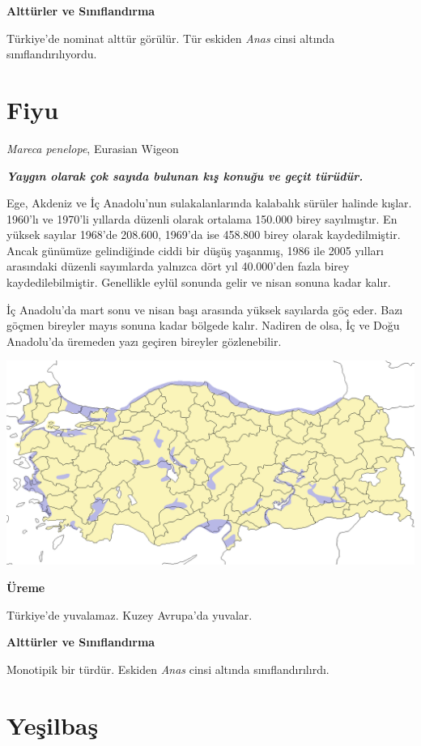 \documentclass[
  a4paper,
  DIV=11,
  numbers=noendperiod]{scrartcl}
\begin{document}
\textbf{Alttürler ve Sınıflandırma}

Türkiye'de nominat alttür görülür. Tür eskiden \emph{Anas} cinsi altında
sınıflandırılıyordu.

\section{Fiyu}\label{fiyu}

\emph{Mareca penelope}, Eurasian Wigeon

\textbf{\emph{Yaygın olarak çok sayıda bulunan kış konuğu ve geçit
türüdür.}}

Ege, Akdeniz ve İç Anadolu'nun sulakalanlarında kalabalık sürüler
halinde kışlar. 1960'lı ve 1970'li yıllarda düzenli olarak ortalama
150.000 birey sayılmıştır. En yüksek sayılar 1968'de 208.600, 1969'da
ise 458.800 birey olarak kaydedilmiştir. Ancak günümüze gelindiğinde
ciddi bir düşüş yaşanmış, 1986 ile 2005 yılları arasındaki düzenli
sayımlarda yalnızca dört yıl 40.000'den fazla birey kaydedilebilmiştir.
Genellikle eylül sonunda gelir ve nisan sonuna kadar kalır.

İç Anadolu'da mart sonu ve nisan başı arasında yüksek sayılarda göç
eder. Bazı göçmen bireyler mayıs sonuna kadar bölgede kalır. Nadiren de
olsa, İç ve Doğu Anadolu'da üremeden yazı geçiren bireyler gözlenebilir.

\includegraphics{images/harita_Mareca penelope.png}

\textbf{Üreme}

Türkiye'de yuvalamaz. Kuzey Avrupa'da yuvalar.

\textbf{Alttürler ve Sınıflandırma}

Monotipik bir türdür. Eskiden \emph{Anas} cinsi altında
sınıflandırılırdı.

\section{Yeşilbaş}\label{yeux15filbaux15f}
\end{document}
